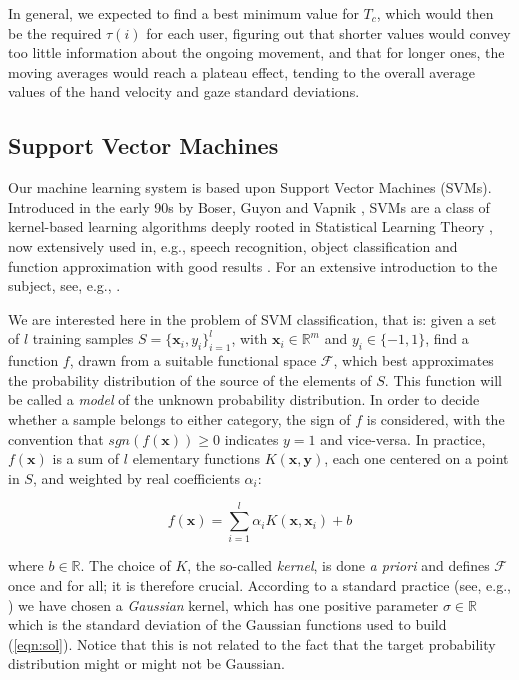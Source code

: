 \documentclass[jou,a4paper,notxfonts]{apa}
\def\RR{\mathbb{R}}
\def\xx{\mathbf{x}}
\def\yy{\mathbf{y}}
\begin{document}
In general, we expected to find a best minimum value for $T_c$, which
would then be the required $\tau(i)$ for each user, figuring out that
shorter values would convey too little information about the ongoing
movement, and that for longer ones, the moving averages would reach a
plateau effect, tending to the overall average values of the hand
velocity and gaze standard deviations.

\subsection{Support Vector Machines}
\label{subsec:svm}

Our machine learning system is based upon Support Vector Machines
(SVMs). Introduced in the early 90s by Boser, Guyon and Vapnik
\cite{BGV92}, SVMs are a class of kernel-based learning algorithms
deeply rooted in Statistical Learning Theory \cite{v-edbed-82}, now
extensively used in, e.g., speech recognition, object classification
and function approximation with good results \cite{Cristianini00}. For
an extensive introduction to the subject, see, e.g., \cite{Burges98}.

We are interested here in the problem of SVM classification, that is:
given a set of $l$ training samples $S=\{\xx_i,y_i\}_{i=1}^l$, with
$\xx_i \in \RR^m$ and $y_i \in \{-1,1\}$, find a function $f$, drawn
from a suitable functional space $\mathcal{F}$, which best
approximates the probability distribution of the source of the
elements of $S$. This function will be called a \emph{model} of the
unknown probability distribution. In order to decide whether a sample
belongs to either category, the sign of $f$ is considered, with the
convention that $sgn(f(\xx)) \geq 0$ indicates $y = 1$ and
vice-versa. In practice, $f(\xx)$ is a sum of $l$ elementary functions
$K(\xx,\yy)$, each one centered on a point in $S$, and weighted by
real coefficients $\alpha_i$:

\begin{equation} \label{eqn:sol}
  f(\xx) = \sum_{i=1}^l \alpha_i K(\xx,\xx_i) + b
\end{equation}

\noindent where $b \in \RR$. The choice of $K$, the so-called
\emph{kernel}, is done \emph{a priori} and defines $\mathcal{F}$ once
and for all; it is therefore crucial. According to a standard practice
(see, e.g., \cite{Cristianini00}) we have chosen a \emph{Gaussian}
kernel, which has one positive parameter $\sigma \in \RR$ which is the
standard deviation of the Gaussian functions used to build
(\ref{eqn:sol}). Notice that this is not related to the fact that the
target probability distribution might or might not be Gaussian.
\end{document}
